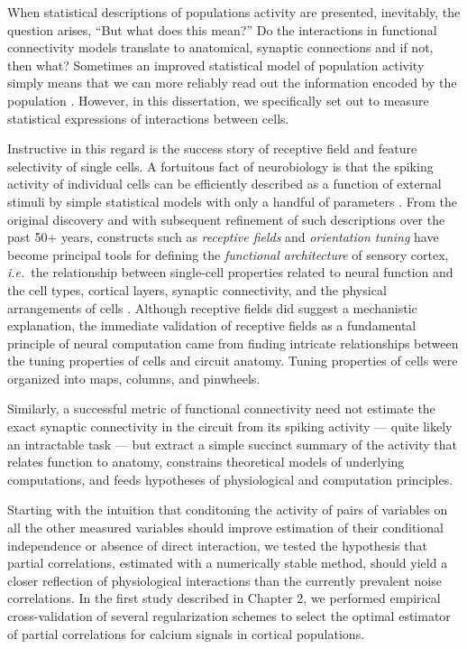 When statistical descriptions of populations activity are presented, inevitably, the question arises, ``But what does this mean?'' 
Do the interactions in functional connectivity models translate to anatomical, synaptic connections and if not, then what?  Sometimes an improved statistical model of population activity simply means that we can more reliably read out  the information encoded by the population \citep{Pillow:2011}. However, in this dissertation, we specifically set out to measure statistical expressions of interactions between cells. 
 
Instructive in this regard is the success story of receptive field and feature selectivity of single cells. 
A fortuitous fact of neurobiology is that the spiking activity of individual cells can be efficiently described as a function of external stimuli by simple statistical models with only a handful of parameters \citep{Carandini:2005}. From the original discovery and with subsequent refinement of such descriptions over the past 50+ years, constructs such as \emph{receptive fields} and \emph{orientation tuning} have become principal tools for defining the \emph{functional architecture} of sensory cortex, \emph{i.e.}\ the relationship between single-cell properties related to neural function and the cell types, cortical layers, synaptic connectivity, and the physical arrangements of cells  \citep{Hubel:1962,Ohki:2005,Reid:2012}. Although receptive fields did suggest a mechanistic explanation, the immediate validation of receptive fields as a fundamental principle of neural computation came from finding intricate relationships between the tuning properties of cells and circuit anatomy. Tuning properties of cells were organized into maps, columns, and pinwheels. 

Similarly, a successful metric of functional connectivity need not estimate the exact synaptic connectivity in the circuit from its spiking activity --- quite likely an intractable task --- but extract a simple succinct summary of the activity that relates function to anatomy, constrains theoretical models of underlying computations, and feeds hypotheses of  physiological and computation principles.

 Starting with the intuition that conditoning the activity of pairs of variables on all the other measured variables should improve estimation of their conditional independence or absence of direct interaction, we tested the hypothesis that partial correlations, estimated with a numerically stable method, should yield a closer reflection of physiological interactions than the currently prevalent noise correlations. In the first study described in Chapter 2, we performed empirical cross-validation of several regularization schemes to select the optimal estimator of partial correlations for calcium signals in cortical populations. 

